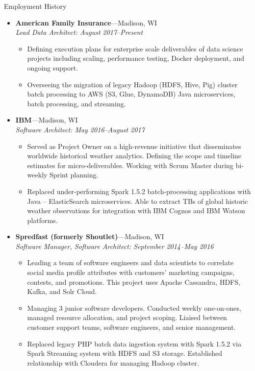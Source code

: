 \documentclass[11pt,oneside]{article}
\newenvironment{ressectionx}[1]{
	\vspace{4pt}
	{\fontfamily{phv}\selectfont\Large#1}
	\begin{itemize}[label={}]
	\vspace{3pt}
}{
	\end{itemize}
}
\newcommand{\ressubitem}[1]{
	\vspace{-1pt}
	\item \begin{flushleft} #1 \end{flushleft}
}
\newcommand{\resbigitem}[3]{
	\vspace{-5pt}
	\item
	\textbf{#1}---#2 \\
	\textit{#3}
}
\newenvironment{ressubsec}[3]{
	\resbigitem{#1}{#2}{#3}
	\vspace{-2pt}
	\begin{itemize}
}{
	\end{itemize}
}
\begin{document}
\begin{ressectionx}{Employment History}

\begin{ressubsec}{American Family Insurance}{Madison, WI}{Lead Data Architect: August 2017--Present}
		\ressubitem{Defining execution plans for enterprise scale deliverables of data science projects including scaling, performance testing, Docker deployment, and ongoing support.}
	\ressubitem{Overseeing the migration of legacy Hadoop (HDFS, Hive, Pig) cluster batch processing to AWS (S3, Glue, DynamoDB) Java microservices, batch processing, and streaming.}	
	\end{ressubsec}


\begin{ressubsec}{IBM}{Madison, WI}{Software Architect: May 2016--August 2017}
		\ressubitem{Served as Project Owner on a high-revenue initiative that disseminates worldwide historical weather analytics. Defining the scope and timeline estimates for micro-deliverables. Working with Scrum Master during bi-weekly Sprint planning.}
		\ressubitem{Replaced under-performing Spark 1.5.2 batch-processing applications with Java -- ElasticSearch microservices. Able to extract TBs of global historic weather observations for integration with IBM Cognos and IBM Watson platforms.}	
	\end{ressubsec}

\begin{ressubsec}{Spredfast (formerly Shoutlet)}{Madison, WI}{Software Manager, Software Architect: September 2014--May 2016}
		\ressubitem{Leading a team of software engineers and data scientists to correlate social media profile attributes with customers' marketing campaigns, contests, and promotions. This project uses Apache Cassandra, HDFS, Kafka, and Solr Cloud.}
		\ressubitem{Managing 3 junior software developers. Conducted weekly one-on-ones, managed resource allocation, and project scoping. Liaised between customer support teams, software engineers, and senior management.}
	\ressubitem{Replaced legacy PHP batch data ingestion system with Spark 1.5.2 via Spark Streaming system with HDFS and S3 storage. Established relationship with Cloudera for managing Hadoop cluster.}


\end{ressubsec}
\end{ressectionx}
\end{document}
